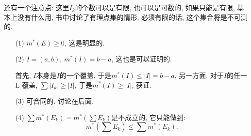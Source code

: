 \documentclass[12pt,a4paper,openany]{book}
\begin{document}
还有一个注意点: 这里$I_k$的个数可以是有限, 也可以是可数的, 如果只能是有限, 基本上没有什么用, 书中讨论了有理点集的情形, 必须有限的话, 这个集合将是不可测的.

\begin{enumerate}
\item[(1)] $m^*(E) \ge 0$, 这是明显的.

\item[(2)] $I = (a, b)$, $m^*(I) = b - a$, 这也是可以证明的.

首先, $I$本身是$I$的一个覆盖, 于是$m^*(I) \le |I| = b - a$, 另一方面, 对于$I$的任一L-覆盖, $\sum{|I_k|} \ge |I|$, 于是$m^*(I) \ge |I|$, 获证.

\item[(3)] 可合同的. 讨论在后面.

\item[(4)] $\sum{m^*(E_k)} = m^*(\sum{E_k})$是不成立的, 它只能做到: 
\[
m^*(\sum{E_k}) \le \sum{m^*(E_k)}.
\]

\end{enumerate}
\end{document}
